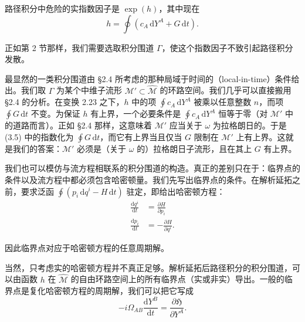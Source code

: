 \documentclass[11pt,a4paper,UTF8]{ctexart}
\theoremstyle{plain}
\theoremstyle{definition}
\begin{document}
路径积分中危险的实指数因子是 $\exp(h)$，其中现在
\begin{equation}
    h=\oint\left(c_A\,\mathrm{d}Y^A+G\,\mathrm{d}t\right).
    \tag{3.5}
\end{equation}

正如第 2 节那样，我们需要选取积分围道 $\Gamma$，使这个指数因子不致引起路径积分发散。

最显然的一类积分围道由 §2.4 所考虑的那种局域于时间的（local-in-time）条件给出。我们取 $\Gamma$ 为某个中维子流形 $\mathcal{M}'\subset\widehat{\mathcal{M}}$ 的环路空间。我们几乎可以直接搬用 §2.4 的分析。在变换 2.23 之下，$h$ 中的项 $\oint c_A\,\mathrm{d}Y^A$ 被乘以任意整数 $n$，而项 $\oint G\,\mathrm{d}t$ 不变。为保证 $h$ 有上界，一个必要条件是 $\oint c_A\,\mathrm{d}Y^A$ 恒等于零（对 $\mathcal{M}'$ 中的道路而言）。正如 §2.4 那样，这意味着 $\mathcal{M}'$ 应当关于 $\omega$ 为拉格朗日的。于是 (3.5) 中的指数化为 $\oint G\,\mathrm{d}t$，而它有上界当且仅当 $G$ 限制在 $\mathcal{M}'$ 上有上界。这就是我们的答案：$\mathcal{M}'$ 必须是（关于 $\omega$ 的）拉格朗日子流形，且在其上 $G$ 有上界。


我们也可以模仿与流方程相联系的积分围道的构造。真正的差别只在于：临界点的条件以及流方程中都必须包含哈密顿量。我们先写出临界点的条件。在解析延拓之前，要求泛函 $\oint\left(p_i\,\mathrm{d}q^i-H\,\mathrm{d}t\right)$ 驻定，即给出哈密顿方程：
\begin{equation}
    \begin{aligned}
        \frac{\mathrm{d}q^i}{\mathrm{d}t} &= \frac{\partial H}{\partial p_i}\\
        \frac{\mathrm{d}p_i}{\mathrm{d}t} &= -\frac{\partial H}{\partial q^i}.
    \end{aligned}
    \tag{3.6}
\end{equation}

因此临界点对应于哈密顿方程的任意周期解。

当然，只考虑实的哈密顿方程并不真正足够。解析延拓后路径积分的积分围道，可以由函数 $h$ 在 $\widehat{\mathcal{M}}$ 的自由环路空间上的所有临界点（实或非实）导出。一般的临界点是复化哈密顿方程的周期解，我们可以把它写成
\begin{equation}
    -i\Omega_{AB}\frac{\mathrm{d}Y^B}{\mathrm{d}t}=\frac{\partial\mathfrak{H}}{\partial Y^A}.
    \tag{3.7}
\end{equation}
\end{document}
